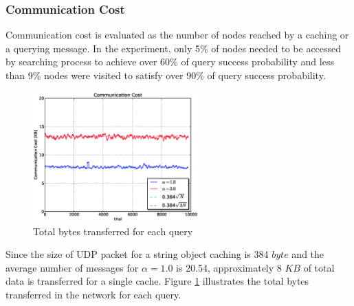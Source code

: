 \documentclass[9.5pt,journal,final,finalsubmission,twocolumn]{IEEEtran}
\begin{document}
\subsubsection{Communication Cost}
Communication cost is evaluated as the number of nodes reached by 
a caching or a querying message. 
In the experiment, only 5\% of nodes needed to be accessed by 
searching process to 
achieve over 60\% of query success probability and less than 9\%
nodes were visited to satisfy over 90\% of query success probability.
\begin{figure}
\centering
\includegraphics[width=2.5in]{plab_cost_kb}
\caption{Total bytes transferred for each query}
\label{fig:plab_cost}
\end{figure}
Since the size of UDP packet for a string object caching is 384 $byte$
and the average number of messages for $\alpha=1.0$ is 20.54, 
approximately 8 $KB$ of total data is transferred for a single cache.
Figure \ref{fig:plab_cost} illustrates the total bytes transferred
in the network for each query. 
\end{document}

